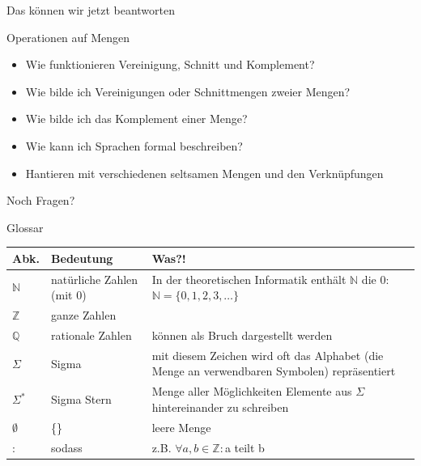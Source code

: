 \documentclass[10pt]{beamer}
\begin{document}
\begin{frame}[fragile]{Das können wir jetzt beantworten}
    \begin{alertblock}{Operationen auf Mengen}
    \begin{itemize}
        \item Wie funktionieren Vereinigung, Schnitt und Komplement?
        \item Wie bilde ich Vereinigungen oder Schnittmengen zweier Mengen?
        \item Wie bilde ich das Komplement einer Menge?
        \item Wie kann ich Sprachen formal beschreiben?
        \item Hantieren mit verschiedenen seltsamen Mengen und den Verknüpfungen
    \end{itemize}
    \end{alertblock}
\end{frame}

\begin{frame}[standout]
  Noch Fragen?
\end{frame}

\begin{frame}[fragile]{Glossar}
    \small
    \begin{tabular}{p{} p{} p{}}
    \toprule
    Abk.&Bedeutung&Was?!\\
    \midrule
        $\mathbb{N}$&natürliche Zahlen (mit 0)&In der theoretischen Informatik enthält $\mathbb{N}$ die 0: $\mathbb{N}=\{0,1,2,3,\dots\}$\\
        $\mathbb{Z}$&ganze Zahlen&\\
        $\mathbb{Q}$&rationale Zahlen&können als Bruch dargestellt werden\\
        $\Sigma$ & Sigma& mit diesem Zeichen wird oft das Alphabet (die Menge an verwendbaren Symbolen) repräsentiert\\
        $\Sigma^\ast$&Sigma Stern&Menge aller Möglichkeiten Elemente aus $\Sigma$ hintereinander zu schreiben\\
        $\emptyset$&\{\}&leere Menge\\
        :&sodass&z.B. $\forall a,b\in\mathbb{Z}:$a teilt b\\
    \bottomrule
    \end{tabular}
\end{frame}
\end{document}

